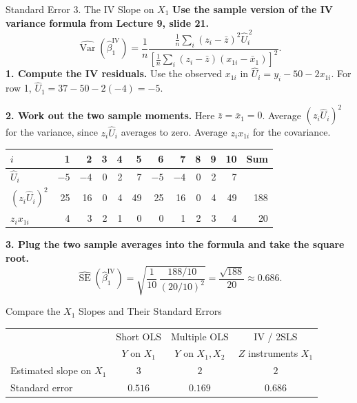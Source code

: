 \documentclass[10pt,aspectratio=169]{beamer}
\newcommand{\Var}{\operatorname{Var}}
\newcommand{\SE}{\operatorname{SE}}
\begin{document}
\begin{frame}{Standard Error 3. The IV Slope on $X_1$}
\small
\setlength{\abovedisplayskip}{5pt}
\setlength{\belowdisplayskip}{5pt}
\textbf{Use the sample version of the IV variance formula from Lecture 9, slide 21.}
\[
\widehat{\Var}(\hat\beta_1^{\mathrm{IV}})
=\frac{1}{n}
\frac{\tfrac{1}{n}\sum\nolimits_i (z_i-\bar z)^2\widehat U_i^{\,2}}
     {\left[\tfrac{1}{n}\sum\nolimits_i (z_i-\bar z)(x_{1i}-\bar x_1)\right]^2}.
\]
\textbf{1. Compute the IV residuals.} Use the observed $x_{1i}$ in
$\widehat U_i=y_i-50-2x_{1i}$. For row 1, $\widehat U_1=37-50-2(-4)=-5$.

\vspace{2pt}
\textbf{2. Work out the two sample moments.} Here $\bar z=\bar x_1=0$.
Average $(z_i\widehat U_i)^2$ for the variance, since $z_i\widehat U_i$ averages to zero. Average $z_i x_{1i}$ for the covariance.
\begin{center}
\setlength{\tabcolsep}{4pt}
\begin{tabular}{lrrrrrrrrrrr}
\toprule
$i$ & 1&2&3&4&5&6&7&8&9&10& Sum\\
\midrule
$\widehat U_i$ & $-5$&$-4$&0&2&7&$-5$&$-4$&0&2&7&\\
$(z_i\widehat U_i)^2$ & 25&16&0&4&49&25&16&0&4&49&188\\
$z_i x_{1i}$ & 4&3&2&1&0&0&1&2&3&4&20\\
\bottomrule
\end{tabular}
\end{center}
\textbf{3. Plug the two sample averages into the formula and take the square root.}
\[
\boxed{\widehat{\SE}(\hat\beta_1^{\mathrm{IV}})
=\sqrt{\frac{1}{10}\,\frac{188/10}{(20/10)^2}}
=\frac{\sqrt{188}}{20}\approx0.686.}
\]
\end{frame}

\begin{frame}{Compare the $X_1$ Slopes and Their Standard Errors}
\begin{center}
\begin{tabular}{lccc}
\toprule
 & Short OLS & Multiple OLS & IV / 2SLS\\
 & $Y$ on $X_1$ & $Y$ on $X_1,X_2$ & $Z$ instruments $X_1$\\
\midrule
Estimated slope on $X_1$ & $3$ & $2$ & $2$\\
Standard error & $0.516$ & $0.169$ & $0.686$\\
\bottomrule
\end{tabular}
\end{center}
\end{frame}
\end{document}
